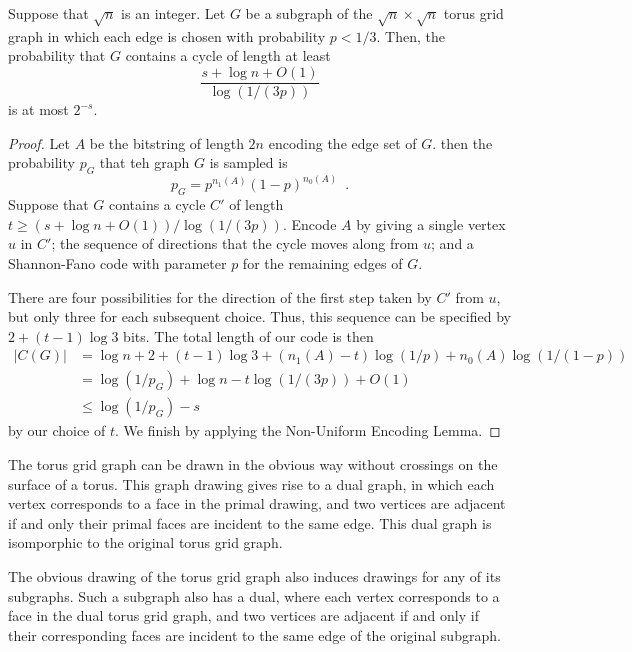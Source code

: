 \documentclass{patmorin}
\begin{document}
\begin{thm}
  Suppose that $\sqrt{n}$ is an integer.  Let $G$ be a subgraph of the
  $\sqrt{n} \times \sqrt{n}$ torus grid graph in which each edge is
  chosen with probability $p < 1/3$. Then, the probability that $G$
  contains a cycle of length at least
  \[
    \frac{s + \log n + O(1)}{\log (1/(3p))}
  \]
  is at most $2^{-s}$.
\end{thm}
\begin{proof}
  Let $A$ be the bitstring of length $2n$ encoding the edge set of
  $G$. then the probability $p_G$ that teh graph $G$ is sampled is
  \[
     p_G  = p^{n_1(A)}(1-p)^{n_0(A)} \enspace .
  \]
  Suppose that $G$ contains a cycle $C'$ of length
  $t \geq (s + \log n + O(1))/\log (1/(3p))$. Encode $A$ by giving a
  single vertex $u$ in $C'$; the sequence of directions that the cycle
  moves along from $u$; and a Shannon-Fano code with parameter $p$ for
  the remaining edges of $G$.

  There are four possibilities for the direction of the
  first step taken by $C'$ from $u$, but only three for each
  subsequent choice. Thus, this sequence can be specified by
  $2 + (t - 1) \log 3$ bits. The total length of our code is then
  \begin{align*}
    |C(G)| &= \log n + 2 + (t - 1) \log 3 + (n_1(A) - t) \log (1/p) +
             n_0(A) \log (1/(1 - p)) \\
           &= \log (1/p_G) + \log n - t \log (1/(3p)) + O(1) \\
           &\leq \log (1/p_G) - s
  \end{align*}
  by our choice of $t$. We finish by applying the Non-Uniform Encoding
  Lemma.
\end{proof}

The torus grid graph can be drawn in the obvious way without crossings
on the surface of a torus. This graph drawing gives rise to a dual
graph, in which each vertex corresponds to a face in the primal
drawing, and two vertices are adjacent if and only their primal faces
are incident to the same edge. This dual graph is isomporphic to the
original torus grid graph.

The obvious drawing of the torus grid graph also induces drawings for
any of its subgraphs. Such a subgraph also has a dual, where each
vertex corresponds to a face in the dual torus grid graph, and two
vertices are adjacent if and only if their corresponding faces are
incident to the same edge of the original subgraph.
\end{document}
